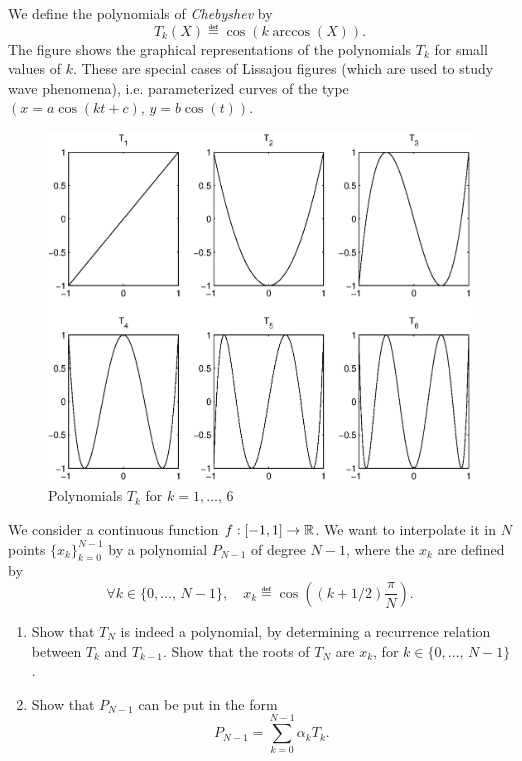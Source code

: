  
\begin{exo}
\label{exo-interpolation-chebyshev}
       We define the polynomials of \textit{Chebyshev} by
\begin{equation*}
T_k (X) \eqdef \cos (k \arccos (X)).
\end{equation*}
The figure  shows the graphical representations of the polynomials $ T_k $ for small values of $ k $. These are special cases of Lissajou figures (which are used to study wave phenomena), i.e. parameterized curves of the type $ (x = a \cos (kt + c), \, y = b \cos (t)) $. \begin{figure}[ht]
    \begin{center}
    \includegraphics [scale = 0.6]{images/polynomes-chebyshev.eps}
    \end{center}
    \caption{Polynomials $ T_k $ for $ k = 1, \ldots, \, 6 $}
              \label{fig-polynomes-chebyshev}
\end{figure}
We consider a continuous function $ f: [-1,1] \rightarrow \mathbb{R} $. We want to interpolate it in $N$ points $ \{x_k\}_{k = 0}^{N-1} $ by a polynomial $ P_{N-1} $ of degree $ N-1 $, where the $ x_k $ are defined by
\begin{equation*}
\forall k \in \{0, \ldots, \, N-1\}, \quad x_k \eqdef \cos \left((k + 1/2) \frac{\pi}{N} \right).
\end{equation*}
\begin{enumerate}
\item Show that $ T_N $ is indeed a polynomial, by determining a recurrence relation between $ T_k $ and $ T_{k-1} $. Show that the roots of $ T_N $ are $ x_k $, for $ k \in \{0, \ldots, \, N-1\} $.
\item Show that $ P_{N-1} $ can be put in the form
\begin{equation*}
P_{N-1} = \sum_{k = 0}^{N-1}{\alpha_k T_k}.
\end{equation*}
 

\end{enumerate}
\end{exo}
